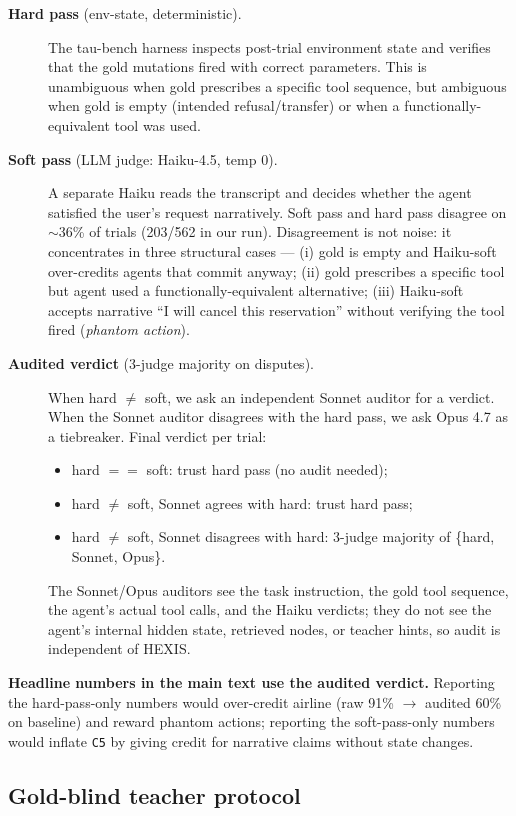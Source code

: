 \begin{description}
\item[\textbf{Hard pass} (env-state, deterministic).] The tau-bench harness inspects post-trial environment state and verifies that the gold mutations fired with correct parameters. This is unambiguous when gold prescribes a specific tool sequence, but ambiguous when gold is empty (intended refusal/transfer) or when a functionally-equivalent tool was used.
\item[\textbf{Soft pass} (LLM judge: Haiku-4.5, temp 0).] A separate Haiku reads the transcript and decides whether the agent satisfied the user's request narratively. Soft pass and hard pass disagree on $\sim$36\% of trials (203/562 in our run). Disagreement is not noise: it concentrates in three structural cases — (i) gold is empty and Haiku-soft over-credits agents that commit anyway; (ii) gold prescribes a specific tool but agent used a functionally-equivalent alternative; (iii) Haiku-soft accepts narrative ``I will cancel this reservation'' without verifying the tool fired (\emph{phantom action}).
\item[\textbf{Audited verdict} (3-judge majority on disputes).] When hard $\neq$ soft, we ask an independent Sonnet auditor for a verdict. When the Sonnet auditor disagrees with the hard pass, we ask Opus 4.7 as a tiebreaker. Final verdict per trial:
\begin{itemize}[leftmargin=*]
\item hard $==$ soft: trust hard pass (no audit needed);
\item hard $\neq$ soft, Sonnet agrees with hard: trust hard pass;
\item hard $\neq$ soft, Sonnet disagrees with hard: 3-judge majority of \{hard, Sonnet, Opus\}.
\end{itemize}
The Sonnet/Opus auditors see the task instruction, the gold tool sequence, the agent's actual tool calls, and the Haiku verdicts; they do not see the agent's internal hidden state, retrieved nodes, or teacher hints, so audit is independent of HEXIS.
\end{description}

\textbf{Headline numbers in the main text use the audited verdict.} Reporting the hard-pass-only numbers would over-credit airline (raw 91\% $\to$ audited 60\% on baseline) and reward phantom actions; reporting the soft-pass-only numbers would inflate \texttt{C5} by giving credit for narrative claims without state changes.

\subsection{Gold-blind teacher protocol}


